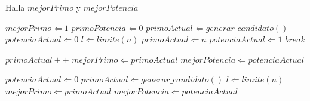 \begin{algorithm}
\caption{Halla $mejorPrimo$ y $mejorPotencia$}
\begin{algorithmic}[1]
\STATE $mejorPrimo \Leftarrow 1$
\STATE $primoPotencia \Leftarrow 0$
\STATE $primoActual \Leftarrow generar\_candidato()$
\STATE $potenciaActual \Leftarrow 0$
\STATE $l \Leftarrow limite(n)$ 
        \STATE $primoActual \Leftarrow n$
        \STATE $potenciaActual \Leftarrow 1$
        \STATE $break$
    \ENDIF

        \STATE $primoActual++$
    \ELSE
            \STATE $mejorPrimo \Leftarrow primoActual$
            \STATE $mejorPotencia \Leftarrow potenciaActual$
        \ENDIF

        \STATE $potenciaActual \Leftarrow 0$
        \STATE $primoActual \Leftarrow generar\_candidato()$
        \STATE $l \Leftarrow limite(n)$
    \ENDIF
\ENDWHILE
{}
    \STATE $mejorPrimo \Leftarrow primoActual$
    \STATE $mejorPotencia \Leftarrow potenciaActual$
\ENDIF
\end{algorithmic}
\end{algorithm}
